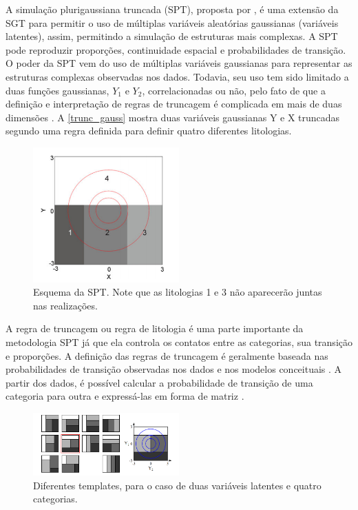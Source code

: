 A simulação plurigaussiana truncada (SPT), proposta por , é uma extensão da SGT para permitir o uso de múltiplas variáveis aleatórias gaussianas (variáveis latentes), assim, permitindo a simulação de estruturas mais complexas. A SPT pode reproduzir proporções, continuidade espacial e probabilidades de transição. O poder da SPT vem do uso de múltiplas variáveis gaussianas para representar as estruturas complexas observadas nos dados. Todavia, seu uso tem sido limitado a duas funções gaussianas, $Y_1$ e $Y_2$, correlacionadas ou não, pelo fato de que a definição e interpretação de regras de truncagem é complicada em mais de duas dimensões \cite{hier_plurigauss}. A \autoref{trunc_gauss} mostra duas variáveis gaussianas Y e X truncadas segundo uma regra definida para definir quatro diferentes litologias.

\begin{figure}[H]
	\caption{\label{trunc_pluri}Esquema da SPT. Note que as litologias 1 e 3 não aparecerão juntas nas realizações.}
	\begin{center}
		\includegraphics[width=0.5\textwidth]{capitulo_3/pluri_sketch.png}
	\end{center}
\end{figure}

A regra de truncagem ou regra de litologia é uma parte importante da metodologia SPT já que ela controla os contatos entre as categorias, sua transição e proporções. A definição das regras de truncagem é geralmente baseada nas probabilidades de transição observadas nos dados e nos modelos conceituais \cite{mariethoz2009truncated}. A partir dos dados, é possível calcular a probabilidade de transição de uma categoria para outra e expressá-las em forma de matriz \cite{advances_in_spt}.

\begin{figure}[H]
	\caption{\label{trunc_rules}Diferentes templates, para o caso de duas variáveis latentes e quatro categorias.}
	\begin{center}
		\includegraphics[width=0.5\textwidth]{capitulo_3/trunc_rules.png}
	\end{center}
\end{figure}

